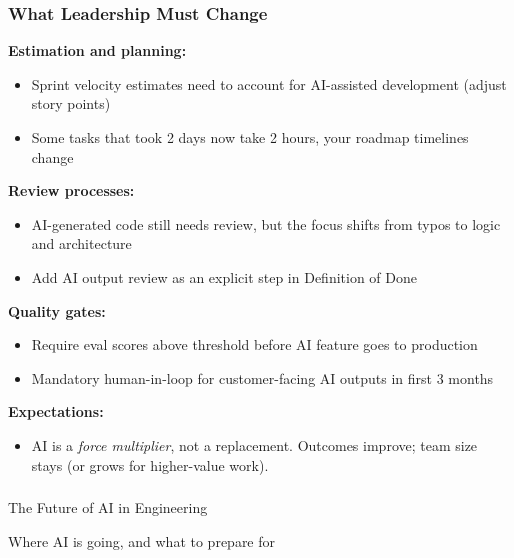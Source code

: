 \begin{frame}[fragile]\frametitle{What Leadership Must Change}
\textbf{Estimation and planning:}
\begin{itemize}
\item Sprint velocity estimates need to account for AI-assisted development (adjust story points)
\item Some tasks that took 2 days now take 2 hours, your roadmap timelines change
\end{itemize}

\textbf{Review processes:}
\begin{itemize}
\item AI-generated code still needs review, but the focus shifts from typos to logic and architecture
\item Add AI output review as an explicit step in Definition of Done
\end{itemize}

\textbf{Quality gates:}
\begin{itemize}
\item Require eval scores above threshold before AI feature goes to production
\item Mandatory human-in-loop for customer-facing AI outputs in first 3 months
\end{itemize}

\textbf{Expectations:}
\begin{itemize}
\item AI is a \textit{force multiplier}, not a replacement. Outcomes improve; team size stays (or grows for higher-value work).
\end{itemize}
\end{frame}


\begin{frame}[fragile]\frametitle{}
\begin{center}
{\Large The Future of AI in Engineering}

{\small Where AI is going, and what to prepare for}
\end{center}
\end{frame}

